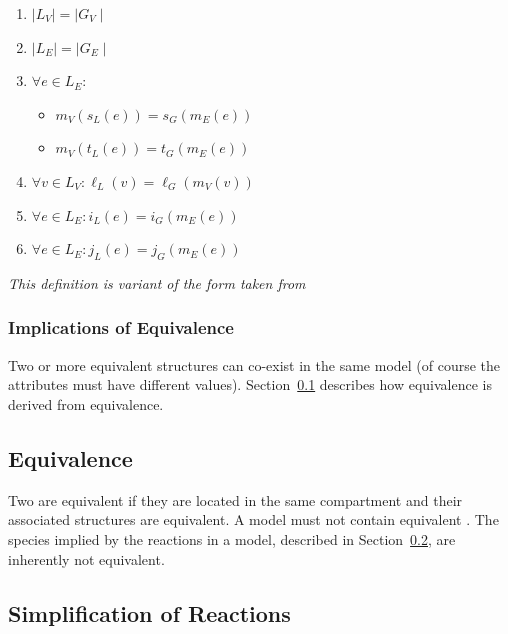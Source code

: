 \documentclass{cekarticle}
\begin{document}
\begin{enumerate}
\item $\mid L_{V} \mid = \mid G_{V} \mid$

\item $\mid L_{E} \mid = \mid G_{E} \mid$

\item $\forall e \in L_{E} : $
    \begin{itemize}
    \item $m_{V}(s_{L}(e))= s_{G}(m_{E}(e))$
    \item $m_{V}(t_{L}(e))= t_{G}(m_{E}(e))$
    \end{itemize}
\item $\forall v \in L_{V} : \ell_{L}(v) = \ell_{G}(m_{V}(v))$
\item $\forall e \in L_{E} : i_{L}(e) = i_{G}(m_{E}(e))$
\item $\forall e \in L_{E} : j_{L}(e) = j_{G}(m_{E}(e))$
\end{enumerate}

\emph{This definition is variant of the form taken from
\citep{rudolf:1998}}

\subsubsection{Implications of  Equivalence}

Two or more equivalent  structures can co-exist
in the same model (of course the  attributes must have
different values).  Section~\ref{sec:species-equals} describes how
 equivalence is derived from 
equivalence.

\subsection{ Equivalence}
\label{sec:species-equals}

Two  are equivalent if they are located in the same
compartment and their associated  structures
are equivalent.  A model must not contain equivalent
. The species implied by the reactions in a model,
described in Section~\ref{sec:reaction-simplification}, are
inherently not equivalent.

\subsection{Simplification of Reactions}
\label{sec:reaction-simplification}
\end{document}
